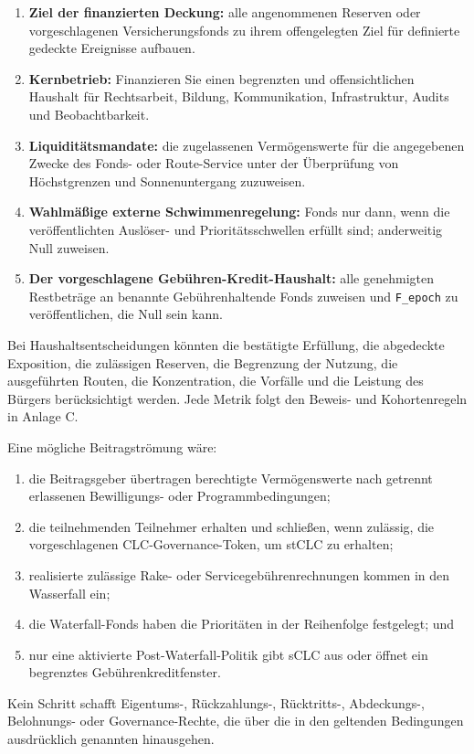 \documentclass[11pt]{article}
\begin{document}
\begin{enumerate}[leftmargin=*]
\item \textbf{Ziel der finanzierten Deckung:} alle angenommenen Reserven oder vorgeschlagenen Versicherungsfonds zu ihrem offengelegten Ziel für definierte gedeckte Ereignisse aufbauen.
\item \textbf{Kernbetrieb:} Finanzieren Sie einen begrenzten und offensichtlichen Haushalt für Rechtsarbeit, Bildung, Kommunikation, Infrastruktur, Audits und Beobachtbarkeit.
\item \textbf{Liquiditätsmandate:} die zugelassenen Vermögenswerte für die angegebenen Zwecke des Fonds- oder Route-Service unter der Überprüfung von Höchstgrenzen und Sonnenuntergang zuzuweisen.
\item \textbf{Wahlmäßige externe Schwimmenregelung:} Fonds nur dann, wenn die veröffentlichten Auslöser- und Prioritätsschwellen erfüllt sind; anderweitig Null zuweisen.
\item \textbf{Der vorgeschlagene Gebühren-Kredit-Haushalt:} alle genehmigten Restbeträge an benannte Gebührenhaltende Fonds zuweisen und \texttt{F\_epoch} zu veröffentlichen, die Null sein kann.
\end{enumerate}
Bei Haushaltsentscheidungen könnten die bestätigte Erfüllung, die abgedeckte Exposition, die zulässigen Reserven, die Begrenzung der Nutzung, die ausgeführten Routen, die Konzentration, die Vorfälle und die Leistung des Bürgers berücksichtigt werden. Jede Metrik folgt den Beweis- und Kohortenregeln in Anlage C.

Eine mögliche Beitragströmung wäre:

\begin{enumerate}[leftmargin=*]
\item die Beitragsgeber übertragen berechtigte Vermögenswerte nach getrennt erlassenen Bewilligungs- oder Programmbedingungen;
\item die teilnehmenden Teilnehmer erhalten und schließen, wenn zulässig, die vorgeschlagenen CLC-Governance-Token, um stCLC zu erhalten;
\item realisierte zulässige Rake- oder Servicegebührenrechnungen kommen in den Wasserfall ein;
\item die Waterfall-Fonds haben die Prioritäten in der Reihenfolge festgelegt; und
\item nur eine aktivierte Post-Waterfall-Politik gibt sCLC aus oder öffnet ein begrenztes Gebührenkreditfenster.
\end{enumerate}
Kein Schritt schafft Eigentums-, Rückzahlungs-, Rücktritts-, Abdeckungs-, Belohnungs- oder Governance-Rechte, die über die in den geltenden Bedingungen ausdrücklich genannten hinausgehen.
\end{document}
